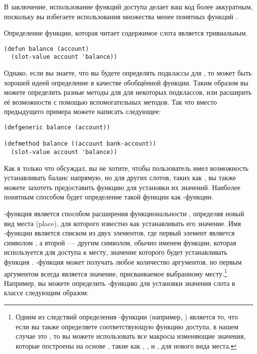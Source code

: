 В заключение, использование функций доступа делает ваш код более аккуратным, поскольку вы
избегаете использования множества менее понятных функций .

Определение функции, которая читает содержимое слота  является тривиальным.

\begin{lstlisting}
(defun balance (account)
  (slot-value account 'balance))
\end{lstlisting}

Однако, если вы знаете, что вы будете определять подклассы для , то
может быть хорошей идеей определение  в качестве обобщённой функции.  Таким
образом вы можете определить разные методы для  для некоторых подклассов,
или расширить её возможности с помощью вспомогательных методов. Так что вместо предыдущего
примера можете написать следующее:

\begin{lstlisting}
(defgeneric balance (account))

(defmethod balance ((account bank-account))
  (slot-value account 'balance))
\end{lstlisting}

Как я только что обсуждал, вы не хотите, чтобы пользователь имел возможность устанавливать
баланс напрямую, но для других слотов, таких как , вы также можете
захотеть предоставить функцию для установки их значений.  Наиболее понятным способом будет
определение такой функции как -функции.

-функция является способом расширения функциональности , определяя
новый вид места (place), для которого известно как устанавливать его значение.  Имя
-функции является списком из двух элементов, где первый элемент является
символом , а второй~--- другим символом, обычно именем функции, которая
используется для доступа к месту, значение которого будет устанавливать функция
.  -функция может получать любое количество аргументов, но первым
аргументом всегда является значение, присваиваемое выбранному месту.\footnote{Одним из
  следствий определения -функции (например, ) является то, что
  если вы также определяете соответствующую функцию доступа, в нашем случае это
  , то вы можете использовать все макросы изменяющие значения, которые построены
  на основе , такие как , ,  и , для
  нового вида места.}  Например, вы можете определить -функцию для установки
значения слота  в классе  следующим образом:


